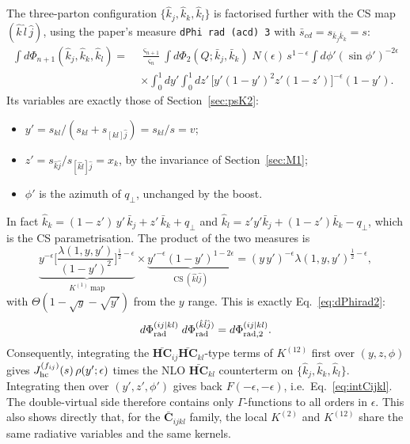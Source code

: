 \documentclass[11pt,a4paper]{article}
\newcommand{\bbC}[1]{\bar{\mathbf C}_{#1}}
\newcommand{\bbHC}[1]{\bar{\mathbf{HC}}_{#1}}
\newcommand{\jb}{\bar k_{j}}
\newcommand{\kb}{\bar k_{k}}
\newcommand{\jh}{\hat k_{j}}
\newcommand{\kh}{\hat k_{k}}
\newcommand{\lh}{\hat k_{l}}
\newcommand{\eps}{\epsilon}
\begin{document}
The three-parton configuration $\{\jh,\kh,\lh\}$ is factorised further with the CS map $(\hat k\,\hat l\,\hat j)$, using the paper's measure \texttt{dPhi rad (acd) 3}
with $\bar s_{cd}=s_{\jb\kb}=s$:
\begin{equation}
\begin{aligned}
\int d\Phi_{n+1}(\jh,\kh,\lh)=\;&\frac{\varsigma_{n+1}}{\varsigma_n}\int d\Phi_2(Q;\jb,\kb)\;N(\eps)\,s^{1-\eps}\!\int\!d\phi'(\sin\phi')^{-2\eps}\\
&\times\int_0^1\!\!dy'\!\int_0^1\!\!dz'\,\big[y'(1-y')^2z'(1-z')\big]^{-\eps}(1-y').
\end{aligned}
\end{equation}
Its variables are exactly those of Section~\ref{sec:psK2}:
\begin{itemize}
\item $y'=s_{kl}/(s_{kl}+s_{[kl]\hat j})=s_{kl}/s=v$;
\item $z'=s_{\hat k\hat j}/s_{[\hat k\hat l]\hat j}=x_k$, by the invariance of Section~\ref{sec:M1};
\item $\phi'$ is the azimuth of $q_\perp$, unchanged by the boost.
\end{itemize}
In fact $\kh=(1-z')\,y'\,\jb+z'\,\kb+q_\perp$ and $\lh=z'y'\jb+(1-z')\kb-q_\perp$, which is the CS parametrisation.
The product of the two measures is
\begin{equation}
\underbrace{y^{-\eps}\Big[\frac{\lambda(1,y,y')}{(1-y')^2}\Big]^{\frac12-\eps}}_{K^{(1)}\ \text{map}}\times
\underbrace{y'^{-\eps}(1-y')^{1-2\eps}}_{\text{CS}\ (\hat k\hat l\hat j)}
=(y\,y')^{-\eps}\lambda(1,y,y')^{\frac12-\eps},
\end{equation}
with $\Theta(1-\sqrt y-\sqrt{y'})$ from the $y$ range. This is exactly Eq.~\eqref{eq:dPhirad2}:
\begin{equation}
d\Phi^{(ij|kl)}_{\rm rad}\;d\Phi^{(\hat k\hat l\hat j)}_{\rm rad}=d\Phi^{(ij|kl)}_{{\rm rad},2}.
\end{equation}
Consequently, integrating the $\bbHC{ij}\bbHC{kl}$-type terms of $K^{(12)}$ first over $(y,z,\phi)$ gives
$J_{\rm hc}^{(f_{ij})}(s)\,\rho(y';\eps)$ times the NLO $\bar{\mathbf{HC}}_{kl}$ counterterm on $\{\jh,\kh,\lh\}$.
Integrating then over $(y',z',\phi')$ gives back $F(-\eps,-\eps)$, i.e.\ Eq.~\eqref{eq:intCijkl}.
The double-virtual side therefore contains only $\Gamma$-functions to all orders in $\eps$.
This also shows directly that, for the $\bbC{ijkl}$ family, the local $K^{(2)}$ and $K^{(12)}$ share the same radiative variables and the same kernels.
\end{document}
